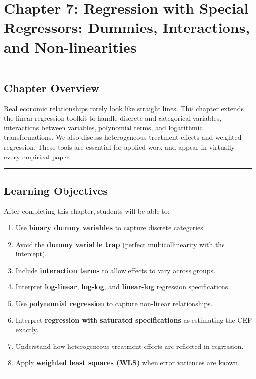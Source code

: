 \chapter{Chapter 7: Regression with Special Regressors: Dummies, Interactions, and Non-linearities}

\medskip\hrule\medskip

\section{Chapter Overview}

Real economic relationships rarely look like straight lines. This chapter extends the linear regression toolkit to handle discrete and categorical variables, interactions between variables, polynomial terms, and logarithmic transformations. We also discuss heterogeneous treatment effects and weighted regression. These tools are essential for applied work and appear in virtually every empirical paper.

\medskip\hrule\medskip

\section{Learning Objectives}

After completing this chapter, students will be able to:

\begin{enumerate}
\item Use \textbf{binary dummy variables} to capture discrete categories.
\item Avoid the \textbf{dummy variable trap} (perfect multicollinearity with the intercept).
\item Include \textbf{interaction terms} to allow effects to vary across groups.
\item Interpret \textbf{log-linear}, \textbf{log-log}, and \textbf{linear-log} regression specifications.
\item Use \textbf{polynomial regression} to capture non-linear relationships.
\item Interpret \textbf{regression with saturated specifications} as estimating the CEF exactly.
\item Understand how heterogeneous treatment effects are reflected in regression.
\item Apply \textbf{weighted least squares (WLS)} when error variances are known.
\end{enumerate}

\medskip\hrule\medskip

